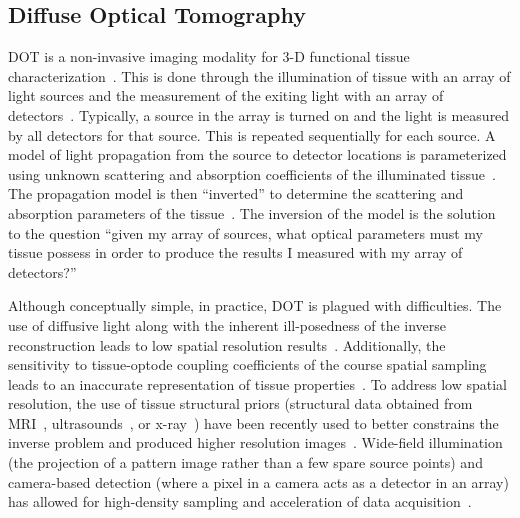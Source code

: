 \subsection{Diffuse Optical Tomography}
\ac{DOT} is a non-invasive imaging modality for 3-D functional tissue characterization~\cite{Boas2001}. This is done through the illumination of tissue with an array of light sources and the measurement of the exiting light with an array of detectors~\cite{Culver2001}. Typically, a source in the array is turned on and the light is measured by all detectors for that source. This is repeated sequentially for each source. A model of light propagation from the source to detector locations is parameterized using unknown scattering and absorption coefficients of the illuminated tissue~\cite{Arridge1999}. The propagation model is then ``inverted'' to determine the scattering and absorption parameters of the tissue~\cite{Arridge1999}. The inversion of the model is the solution to the question ``given my array of sources, what optical parameters must my tissue possess in order to produce the results I measured with my array of detectors?''

Although conceptually simple, in practice, \ac{DOT} is plagued with difficulties. The use of diffusive light along with the inherent ill-posedness of the inverse reconstruction leads to low spatial resolution results~\cite{Arridge2009, Durduran2010}. Additionally, the sensitivity to tissue-optode coupling coefficients of the course spatial sampling leads to an inaccurate representation of tissue properties~\cite{Schweiger2007}. To address low spatial resolution, the use of tissue structural priors (structural data obtained from MRI~\cite{Pearlman2012}, ultrasounds~\cite{Zhu2010}, or x-ray~\cite{Fang2011, Deng2015}) have been recently used to better constrains the inverse problem and produced higher resolution images~\cite{Pearlman2012}. Wide-field illumination (the projection of a pattern image rather than a few spare source points) and camera-based detection (where a pixel in a camera acts as a detector in an array) has allowed for high-density sampling and acceleration of data acquisition~\cite{Belanger2010}. 


